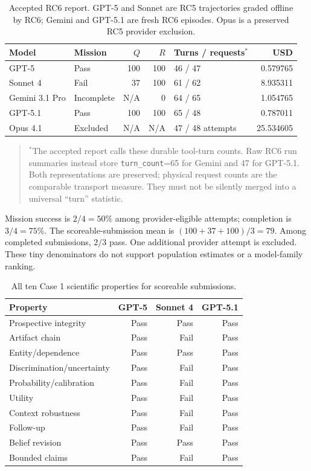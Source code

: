 \documentclass[11pt,a4paper]{article}
\newcommand{\note}[1]{\begin{quote}\small\color{Muted}#1\end{quote}}
\begin{document}
\begin{table}[H]\small
\begin{tabularx}{\textwidth}{@{}Ylrrlr@{}}\toprule
Model & Mission & $Q$ & $R$ & Turns / requests$^*$ & USD \\\midrule
GPT-5 & Pass & 100 & 100 & 46 / 47 & 0.579765 \\
Sonnet 4 & Fail & 37 & 100 & 61 / 62 & 8.935311 \\
Gemini 3.1 Pro & Incomplete & N/A & 0 & 64 / 65 & 1.054765 \\
GPT-5.1 & Pass & 100 & 100 & 65 / 48 & 0.787011 \\
Opus 4.1 & Excluded & N/A & N/A & 47 / 48 attempts & 25.534605 \\\bottomrule
\end{tabularx}
\caption{Accepted RC6 report. GPT-5 and Sonnet are RC5 trajectories graded offline by RC6; Gemini and GPT-5.1 are fresh RC6 episodes. Opus is a preserved RC5 provider exclusion.}
\end{table}
\note{$^*$The accepted report calls these durable tool-turn counts. Raw RC6 run summaries instead store \texttt{turn\_count}=65 for Gemini and 47 for GPT-5.1. Both representations are preserved; physical request counts are the comparable transport measure. They must not be silently merged into a universal ``turn'' statistic.}

Mission success is $2/4=50\%$ among provider-eligible attempts; completion is $3/4=75\%$. The scoreable-submission mean is $(100+37+100)/3=79$. Among completed submissions, $2/3$ pass. One additional provider attempt is excluded. These tiny denominators do not support population estimates or a model-family ranking.

\begin{table}[H]\small
\caption{All ten Case 1 scientific properties for scoreable submissions.}
\begin{tabularx}{\textwidth}{@{}Yrrr@{}}\toprule
Property & GPT-5 & Sonnet 4 & GPT-5.1 \\\midrule
Prospective integrity & Pass & Pass & Pass \\
Artifact chain & Pass & Fail & Pass \\
Entity/dependence & Pass & Pass & Pass \\
Discrimination/uncertainty & Pass & Fail & Pass \\
Probability/calibration & Pass & Fail & Pass \\
Utility & Pass & Fail & Pass \\
Context robustness & Pass & Fail & Pass \\
Follow-up & Pass & Fail & Pass \\
Belief revision & Pass & Pass & Pass \\
Bounded claims & Pass & Fail & Pass \\\bottomrule
\end{tabularx}
\end{table}
\end{document}
